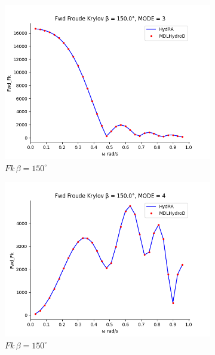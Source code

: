\begin{figure}[H]
    \vspace{5pt}%
    \begin{subfigure}[b]{0.45\textwidth}
        \includegraphics[width=\textwidth]{plots/kvlcc/fk/fk3.png}
        \caption{$Fk \, \beta = 150^{\circ}$}
    \end{subfigure}
    \begin{subfigure}[b]{0.45\textwidth}
        \includegraphics[width=\textwidth]{plots/kvlcc/fk/fk4.png}
        \caption{$Fk \, \beta = 150^{\circ}$}
    \end{subfigure}
    \vspace{5pt}%
    \begin{subfigure}[b]{0.45\textwidth}

\end{subfigure}
\end{figure}
